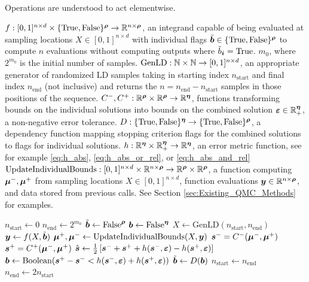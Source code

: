 \documentclass{article}[12pt]
\begin{document}
\begin{algorithm}[h!]
    \caption{ \\ Operations are understood to act elementwise.}
    \label{algo:qmcsc}
    \begin{algorithmic}
    \Require $f: [0,1]^{n \times d} \times \{\text{True},\text{False}\}^{\boldsymbol{\rho}} \to \mathbb{R}^{n \times \boldsymbol{\rho}}$, an integrand capable of being evaluated at sampling locations $X \in [0,1]^{n \times d}$ with individual flags $\tilde{\boldsymbol{b}} \in \{\text{True},\text{False}\}^{\boldsymbol{\rho}}$ to compute $n$ evaluations without computing outputs where $\tilde{b}_{\boldsymbol{i}}=\text{True}$.
    \Require $m_0$, where $2^{m_0}$ is the initial number of samples.
    \Require $\text{GenLD}: \mathbb{N} \times \mathbb{N} \to [0,1]^{n \times d}$, an appropriate generator of randomized LD samples taking in starting index $n_\text{start}$ and final index $n_\text{end}$ (not inclusive) and returns the $n = n_\text{end} - n_\text{start}$ samples in those positions of the sequence. 
    \Require $C^-,C^+: \mathbb{R}^{\boldsymbol{\rho}} \times \mathbb{R}^{\boldsymbol{\rho}} \to \mathbb{R}^{\boldsymbol{\eta}}$, functions transforming bounds on the individual solutions into bounds on the combined solution
    \Require $\boldsymbol{\varepsilon} \in \mathbb{R}_+^{\boldsymbol{\eta}}$, a non-negative error tolerance. 
    \Require $D: \{\text{True},\text{False}\}^{\boldsymbol{\eta}} \to \{\text{True},\text{False}\}^{\boldsymbol{\rho}}$, a dependency function mapping stopping criterion flags for the combined solutions to flags for individual solutions. 
    \Require $h: \mathbb{R}^{\boldsymbol{\eta}} \times \mathbb{R}^{\boldsymbol{\eta}}_+ \to \mathbb{R}^{\boldsymbol{\eta}}$, an error metric function, see for example \eqref{eq:h_abs}, \eqref{eq:h_abs_or_rel}, or \eqref{eq:h_abs_and_rel}
    \Require $\text{UpdateIndividualBounds}: [0,1]^{n \times d} \times \mathbb{R}^{n \times \boldsymbol{\rho}} \to \mathbb{R}^{\boldsymbol{\rho}} \times \mathbb{R}^{\boldsymbol{\rho}}$, a function computing $\boldsymbol{\mu}^-,\boldsymbol{\mu}^+$ from sampling locations $X \in [0,1]^{n \times d}$, function evaluations $\boldsymbol{y} \in \mathbb{R}^{n \times \boldsymbol{\rho}}$, and data stored from previous calls. See Section \ref{sec:Existing_QMC_Methods} for examples. 
    
    \hrulefill
    
    \State $n_\text{start} \gets 0$
    \State $n_\text{end} \gets 2^{m_0}$
    \State $\tilde{\boldsymbol{b}} \gets \text{False}^{\boldsymbol{\rho}}$
    \State $\boldsymbol{b} \gets \text{False}^{\boldsymbol{\eta}}$
        \State $X \gets \text{GenLD}(n_\text{start},n_\text{end})$
        \State $\boldsymbol{y} \gets f(X,\tilde{\boldsymbol{b}})$
        \State $\boldsymbol{\mu}^+,\boldsymbol{\mu}^- \gets \text{UpdateIndividualBounds}(X,\boldsymbol{y})$
        \State $\boldsymbol{s}^- = C^-(\boldsymbol{\mu}^-,\boldsymbol{\mu}^+)$
        \State $\boldsymbol{s}^+ = C^+(\boldsymbol{\mu}^-,\boldsymbol{\mu}^+)$
        \State $\hat{\boldsymbol{s}} \gets \frac{1}{2}\left[\boldsymbol{s}^-+\boldsymbol{s}^++h(\boldsymbol{s}^-,\boldsymbol{\varepsilon})-h(\boldsymbol{s}^+,\boldsymbol{\varepsilon})\right]$
        \State $\boldsymbol{b} \gets \text{Boolean}(\boldsymbol{s}^+-\boldsymbol{s}^- < h(\boldsymbol{s}^-,\boldsymbol{\varepsilon})+h(\boldsymbol{s}^+,\boldsymbol{\varepsilon}))$
        \State $\tilde{\boldsymbol{b}} \gets D(\boldsymbol{b})$
        \State $n_\text{start} \gets n_\text{end}$
        \State $n_\text{end} \gets 2n_\text{start}$
    \EndWhile
    \end{algorithmic}
\end{algorithm}
\end{document}
